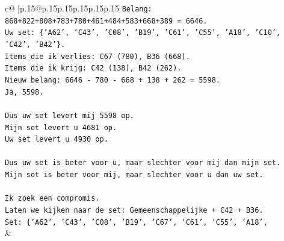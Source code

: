 \documentclass{article}
\begin{document}
{\begin{supertabular}{c@{$\;$}|p{.15\linewidth}@{}p{.15\linewidth}p{.15\linewidth}p{.15\linewidth}p{.15\linewidth}p{.15\linewidth}}
{{{\texttt{Belang: 868+822+808+783+780+461+484+583+668+389 = 6646.} \\
\texttt{Uw set: \{'A62', 'C43', 'C08', 'B19', 'C61', 'C55', 'A18', 'C10', 'C42', 'B42'\}.} \\
\texttt{Items die ik verlies: C67 (780), B36 (668).} \\
\texttt{Items die ik krijg: C42 (138), B42 (262).} \\
\texttt{Nieuw belang: 6646 {-} 780 {-} 668 + 138 + 262 = 5598.} \\
\texttt{Ja, 5598.} \\
\\ 
\texttt{Dus uw set levert mij 5598 op.} \\
\texttt{Mijn set levert u 4681 op.} \\
\texttt{Uw set levert u 4930 op.} \\
\\ 
\texttt{Dus uw set is beter voor u, maar slechter voor mij dan mijn set.} \\
\texttt{Mijn set is beter voor mij, maar slechter voor u dan uw set.} \\
\\ 
\texttt{Ik zoek een compromis.} \\
\texttt{Laten we kijken naar de set: Gemeenschappelijke + C42 + B36.} \\
\texttt{Set: \{'A62', 'C43', 'C08', 'B19', 'C67', 'C61', 'C55', 'A18',} \\
            }
        }
    }
    & \\ \\


\end{supertabular}}
\end{document}
